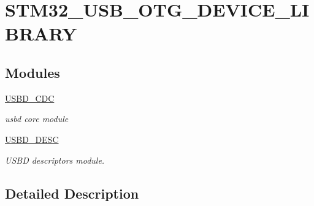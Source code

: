 \hypertarget{group___s_t_m32___u_s_b___o_t_g___d_e_v_i_c_e___l_i_b_r_a_r_y}{}\section{S\+T\+M32\+\_\+\+U\+S\+B\+\_\+\+O\+T\+G\+\_\+\+D\+E\+V\+I\+C\+E\+\_\+\+L\+I\+B\+R\+A\+RY}
\label{group___s_t_m32___u_s_b___o_t_g___d_e_v_i_c_e___l_i_b_r_a_r_y}
\subsection*{Modules}
\begin{DoxyCompactItemize}
\item 
\hyperlink{group___u_s_b_d___c_d_c}{U\+S\+B\+D\+\_\+\+C\+DC}
\begin{DoxyCompactList}\small\item\em usbd core module \end{DoxyCompactList}\item 
\hyperlink{group___u_s_b_d___d_e_s_c}{U\+S\+B\+D\+\_\+\+D\+E\+SC}
\begin{DoxyCompactList}\small\item\em U\+S\+BD descriptors module. \end{DoxyCompactList}\end{DoxyCompactItemize}


\subsection{Detailed Description}
